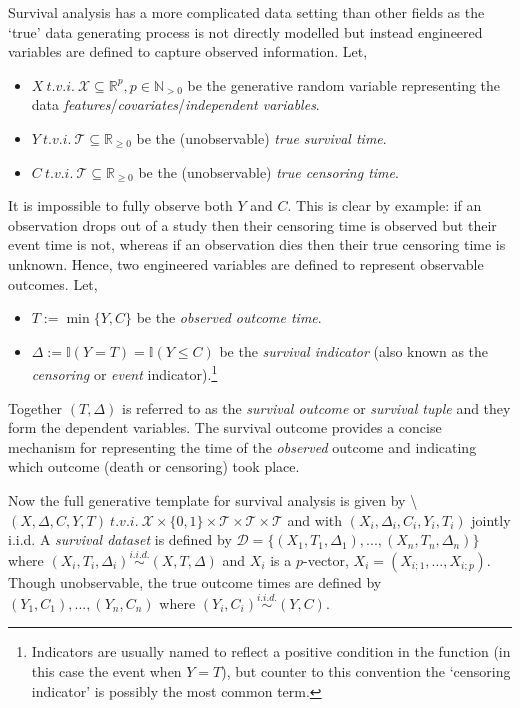 \documentclass[
  letterpaper,
]{scrbook}
\providecommand{\tightlist}{%
  \setlength{\itemsep}{0pt}\setlength{\parskip}{0pt}}\usepackage{longtable,booktabs,array}
\theoremstyle{plain}
\theoremstyle{definition}
\theoremstyle{remark}
\begin{document}
Survival analysis has a more complicated data setting than other fields
as the `true' data generating process is not directly modelled but
instead engineered variables are defined to capture observed
information. Let,

\begin{itemize}
\tightlist
\item
  \(X \ t.v.i. \ \mathcal{X}\subseteq \mathbb{R}^p, p \in \mathbb{N}_{> 0}\)
  be the generative random variable representing the data
  \emph{features}/\emph{covariates}/\emph{independent variables}.
\item
  \(Y \ t.v.i. \ \mathcal{T}\subseteq \mathbb{R}_{\geq 0}\) be the
  (unobservable) \emph{true survival time}.
\item
  \(C \ t.v.i. \ \mathcal{T}\subseteq \mathbb{R}_{\geq 0}\) be the
  (unobservable) \emph{true censoring time}.
\end{itemize}

It is impossible to fully observe both \(Y\) and \(C\). This is clear by
example: if an observation drops out of a study then their censoring
time is observed but their event time is not, whereas if an observation
dies then their true censoring time is unknown. Hence, two engineered
variables are defined to represent observable outcomes. Let,

\begin{itemize}
\tightlist
\item
  \(T := \min\{Y,C\}\) be the \emph{observed outcome time}.
\item
  \(\Delta := \mathbb{I}(Y = T) = \mathbb{I}(Y \leq C)\) be the
  \emph{survival indicator} (also known as the \emph{censoring} or
  \emph{event}
  indicator).\footnote{Indicators are usually named to reflect a positive condition in the function (in this case the event when $Y = T$), but counter to this convention the `censoring indicator' is possibly the most common term.}
\end{itemize}

Together \((T,\Delta)\) is referred to as the \emph{survival outcome} or
\emph{survival tuple} and they form the dependent variables. The
survival outcome provides a concise mechanism for representing the time
of the \emph{observed} outcome and indicating which outcome (death or
censoring) took place.

Now the full generative template for survival analysis is given by
\textbackslash{}
\((X, \Delta, C, Y, T) \ t.v.i. \ \mathcal{X}\times \{0,1\}\times \mathcal{T}\times \mathcal{T}\times \mathcal{T}\)
and with \((X_i, \Delta_i, C_i, Y_i, T_i)\) jointly i.i.d. A
\emph{survival dataset} is defined by
\(\mathcal{D}= \{(X_1,T_1,\Delta_1),...,(X_n,T_n,\Delta_n)\}\) where
\((X_i,T_i,\Delta_i) \stackrel{i.i.d.}\sim(X,T,\Delta)\) and \(X_i\) is
a \(p\)-vector, \(X_i = (X_{i;1},...,X_{i;p})\). Though unobservable,
the true outcome times are defined by \((Y_1,C_1),...,(Y_n,C_n)\) where
\((Y_i,C_i) \stackrel{i.i.d.}\sim(Y,C)\).
\end{document}
